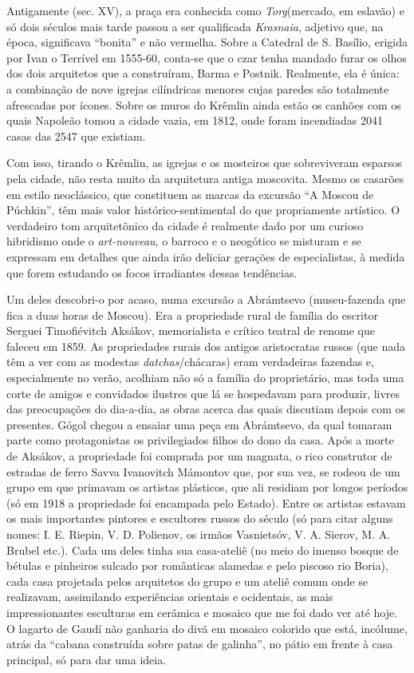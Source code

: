 Antigamente (sec. XV), a praça era conhecida como \emph{Torg}(mercado,
em eslavão) e só dois séculos mais tarde passou a ser qualificada
\emph{Krasnaia}, adjetivo que, na época, significava ``bonita'' e não
vermelha. Sobre a Catedral de S. Basílio, erigida por Ivan o Terrível em
1555-60, conta-se que o czar tenha mandado furar os olhos dos dois
arquitetos que a construíram, Barma e Postnik. Realmente, ela é única: a
combinação de nove igrejas cilíndricas menores cujas paredes são
totalmente afrescadas por ícones. Sobre os muros do Krêmlin ainda estão
os canhões com os quais Napoleão tomou a cidade vazia, em 1812, onde
foram incendiadas 2041 casas das 2547 que existiam.

Com isso, tirando o Krêmlin, as igrejas e os mosteiros que sobreviveram
esparsos pela cidade, não resta muito da arquitetura antiga moscovita.
Mesmo os casarões em estilo neoclássico, que constituem as marcas da
excursão ``A Moscou de Púchkin'', têm mais valor histórico-sentimental
do que propriamente artístico. O verdadeiro tom arquitetônico da cidade
é realmente dado por um curioso hibridismo onde o \emph{art-nouveau}, o
barroco e o neogótico se misturam e se expressam em detalhes que ainda
irão deliciar gerações de especialistas, à medida que forem estudando os
focos irradiantes dessas tendências.

Um deles descobri-o por acaso, numa excursão a Abrámtsevo (museu-fazenda
que fica a duas horas de Moscou). Era a propriedade rural de família do
escritor Serguei Timofiévitch Aksákov, memorialista e crítico teatral de
renome que faleceu em 1859. As propriedades rurais dos antigos
aristocratas russos (que nada têm a ver com as modestas
\emph{datchas}/chácaras) eram verdadeiras fazendas e, especialmente no
verão, acolhiam não só a família do proprietário, mas toda uma corte de
amigos e convidados ilustres que lá se hospedavam para produzir, livres
das preocupações do dia-a-dia, as obras acerca das quais discutiam
depois com os presentes. Gógol chegou a ensaiar uma peça em Abrámtsevo,
da qual tomaram parte como protagonistas os privilegiados filhos do dono
da casa. Após a morte de Aksákov, a propriedade foi comprada por um
magnata, o rico construtor de estradas de ferro Savva Ivanovitch
Mámontov que, por sua vez, se rodeou de um grupo em que primavam os
artistas plásticos, que ali residiam por longos períodos (só em 1918 a
propriedade foi encampada pelo Estado). Entre os artistas estavam os
mais importantes pintores e escultores russos do século (só para citar
alguns nomes: I. E. Riepin, V. D. Polienov, os irmãos Vasnietsóv, V. A.
Sierov, M. A. Brubel etc.). Cada um deles tinha sua casa-ateliê (no meio
do imenso bosque de bétulas e pinheiros sulcado por românticas alamedas
e pelo piscoso rio Boria), cada casa projetada pelos arquitetos do grupo
e um ateliê comum onde se realizavam, assimilando experiências orientais
e ocidentais, as mais impressionantes esculturas em cerâmica e mosaico
que me foi dado ver até hoje. O lagarto de Gaudí não ganharia do divã em
mosaico colorido que está, incólume, atrás da ``cabana construída sobre
patas de galinha'', no pátio em frente à casa principal, só para dar uma
ideia.

